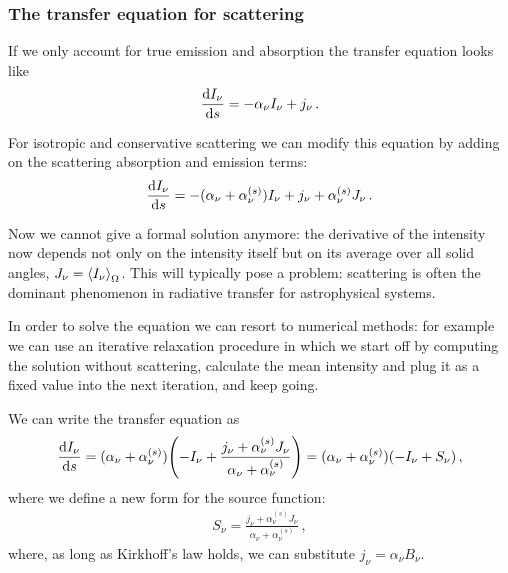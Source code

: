 \documentclass[main.tex]{subfiles}
\begin{document}
\subsubsection{The transfer equation for scattering}


If we only account for true emission and absorption the transfer equation looks like 
%
\begin{align}
\dv{I_\nu }{s} = - \alpha_{\nu } I_\nu + j_\nu 
\,.
\end{align}

For isotropic and conservative scattering we can modify this equation by adding on the scattering absorption and emission terms: 
%
\begin{align}
\dv{I_\nu }{s} = - (\alpha_{\nu } + \alpha_{\nu }^{(s)}) I_\nu + j_\nu + \alpha_{\nu }^{(s)} J_\nu 
\,.
\end{align}

Now we cannot give a formal solution anymore: the derivative of the intensity now depends not only on the intensity itself but on its average over all solid angles, \(J_\nu  = \expval{I_\nu }_{\Omega }\).
This will typically pose a problem: scattering is often the dominant phenomenon in radiative transfer for astrophysical systems. 

In order to solve the equation we can resort to numerical methods: for example we can use an iterative relaxation procedure in which we start off by computing the solution without scattering, calculate the mean intensity and plug it as a fixed value into the next iteration, and keep going. 

We can write the transfer equation as 
%
\begin{align}
\dv{I_\nu }{ s} 
= (\alpha_{\nu } + \alpha_{\nu }^{(s)}) 
\qty(- I_\nu + \frac{j_\nu + \alpha_{\nu }^{(s)} J_\nu }{\alpha_{\nu } + \alpha_{\nu }^{(s)}}) 
= (\alpha_{\nu } + \alpha_{\nu }^{(s)}) 
\qty(-I_\nu  + S_\nu )
\,,
\end{align}
%
where we define a new form for the source function: 
%
\begin{align}
S_\nu = \frac{j_\nu + \alpha_{\nu }^{(s)} J_\nu }{\alpha_{\nu } + \alpha_{\nu }^{(s)}}  
\,,
\end{align}
%
where, as long as Kirkhoff's law holds, we can substitute \(j_\nu = \alpha_{\nu } B_\nu \). 
\end{document}
